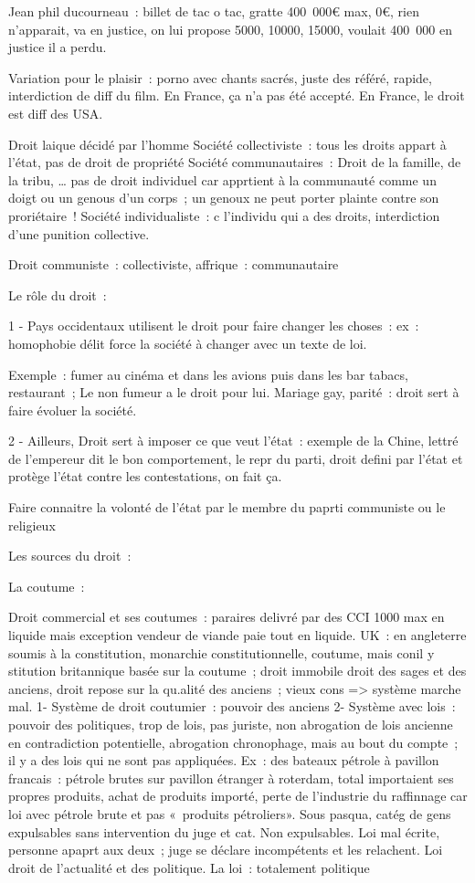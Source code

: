 \documentclass[a4paper,12pt]{article}
\begin{document}
Jean phil ducourneau : billet de tac o tac, gratte 400 000€ max, 0€, rien n’apparait, va en justice, on lui propose 5000, 10000, 15000, voulait 400 000 en justice il a perdu.

Variation pour le plaisir : porno avec chants sacrés, juste des référé, rapide, interdiction de diff du film. En France, ça n’a pas été accepté.
En France, le droit est diff des USA.

Droit laique décidé par l’homme
Société collectiviste : tous les droits appart à l’état, pas de droit de propriété
Société communautaires : Droit de la famille, de la tribu, … pas de droit individuel car apprtient à la communauté comme un doigt ou un genous d’un corps ; un genoux ne peut porter plainte contre son proriétaire ! 
Société individualiste : c l’individu qui a des droits, interdiction d’une punition collective.

Droit communiste : collectiviste, affrique : communautaire


Le rôle du droit : 

1 - Pays occidentaux utilisent le droit pour faire changer les choses : ex : homophobie délit force la société à changer avec un texte de loi.

Exemple : fumer au cinéma et dans les avions puis dans les bar tabacs, restaurant ; 
Le non fumeur a le droit pour lui.  
Mariage gay, parité : droit sert à faire évoluer la société.

2 - Ailleurs, Droit sert à imposer ce que veut l’état : exemple de la Chine, lettré de l’empereur dit le bon comportement, le repr du parti, droit defini par l’état et protège l’état contre les contestations, on fait ça.

Faire connaitre la volonté de l’état par le membre du paprti communiste ou le religieux 


Les sources du droit :

La coutume : 

Droit commercial et ses coutumes : paraires delivré par des CCI 1000 max en liquide mais exception vendeur de viande paie tout en liquide.
UK : en angleterre soumis à la constitution, monarchie constitutionnelle, coutume, mais conil y stitution britannique basée sur la coutume ; droit immobile droit des sages et des anciens, droit repose sur la qu.alité des anciens ; vieux cons => système marche mal.
1- Système de droit coutumier : pouvoir des anciens
2- Système avec lois : pouvoir des politiques, trop de lois, pas juriste, non abrogation de lois ancienne en contradiction potentielle, abrogation chronophage, mais au bout du compte ; il y a des lois qui ne sont pas appliquées.
Ex : des bateaux pétrole à pavillon francais : pétrole brutes sur pavillon étranger à roterdam, total importaient ses propres produits, achat de produits importé, perte de l’industrie du raffinnage car loi avec pétrole brute et pas « produits pétroliers».
Sous pasqua, catég de gens expulsables sans intervention du juge et cat. Non expulsables. Loi mal écrite, personne apaprt aux deux ; juge se déclare incompétents et les relachent.
Loi droit de l’actualité et des politique.
La loi : totalement politique
\end{document}
